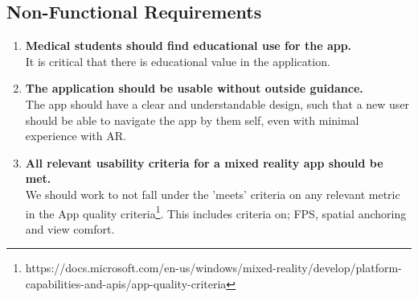 \subsection*{Non-Functional Requirements}

\begin{enumerate}
    \item {
        \textbf{Medical students should find educational use for the app.}\\
        It is critical that there is educational value in the application. 
    }
    \item {
        \textbf{The application should be usable without outside guidance.}\\
        The app should have a clear and understandable design, such that a new user should be able to navigate the app by them self, even with minimal experience with AR.
    }
    \item {
        \textbf{All relevant usability criteria for a mixed reality app should be met.}\\
We should work to not fall under the 'meets' criteria on any relevant metric in the App quality criteria\footnote{https://docs.microsoft.com/en-us/windows/mixed-reality/develop/platform-capabilities-and-apis/app-quality-criteria}. This includes criteria on; FPS, spatial anchoring and view comfort. 
    }
\end{enumerate}